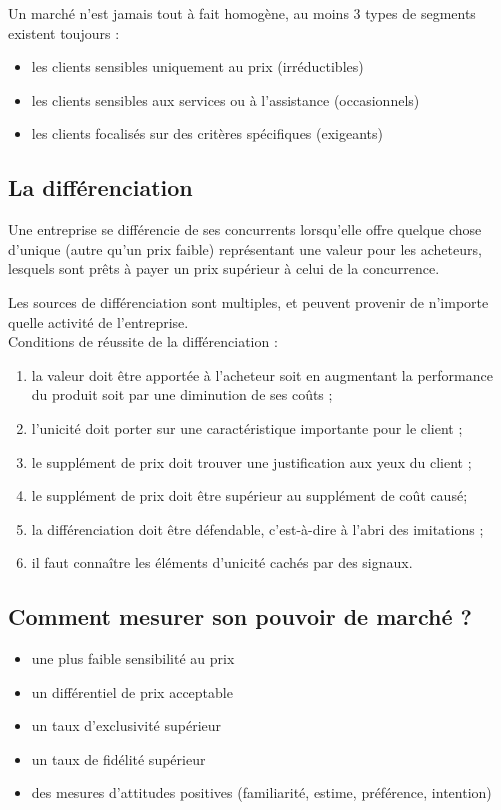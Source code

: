 	Un marché n'est jamais tout à fait homogène, au moins 3 types de segments existent toujours :
		
	\begin{itemize}
		\item les clients sensibles uniquement au prix (irréductibles)
		\item les clients sensibles aux services ou à l'assistance (occasionnels)
		\item les clients focalisés sur des critères spécifiques (exigeants)
	\end{itemize}
		
		
		\subsection{La différenciation}
		
		Une entreprise se différencie de ses concurrents lorsqu'elle offre quelque chose d'unique (autre qu'un prix faible) représentant une valeur pour les acheteurs, lesquels sont prêts à payer un prix supérieur à celui de la concurrence.
		
		Les sources de différenciation sont multiples, et peuvent provenir de n'importe quelle activité de l'entreprise. \\
		
		
		Conditions de réussite de la différenciation :
		
		\begin{enumerate}
			\item la valeur doit être apportée à l'acheteur soit en augmentant la performance du produit soit par une diminution de ses coûts ;
			\item l'unicité doit porter sur une caractéristique importante pour le client ;
			\item le supplément de prix doit trouver une justification aux yeux du client ;
			\item le supplément de prix doit être supérieur au supplément de coût causé;
			\item la différenciation doit être défendable, c'est-à-dire à l'abri des imitations ;
			\item il faut connaître les éléments d'unicité cachés par des signaux.
		\end{enumerate}
		
		
		\subsection{Comment mesurer son pouvoir de marché ?}
		\begin{itemize}
			\item une plus faible sensibilité au prix
			\item un différentiel de prix acceptable
			\item un taux d'exclusivité supérieur
			\item un taux de fidélité supérieur
			\item des mesures d'attitudes positives (familiarité, estime, préférence, intention)
		\end{itemize}	
		
